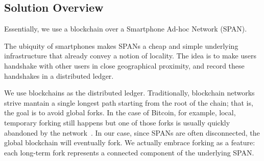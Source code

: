\subsection{Solution Overview}

Essentially,
we use a blockchain over a Smartphone Ad-hoc Network (SPAN).

The ubiquity of smartphones
makes SPANs a cheap and simple underlying infrastructure
that already convey a notion of locality.
The idea is to make users handshake with other users in close geographical proximity,
and record these handshakes in a distributed ledger.

We use blockchains as the distributed ledger.
Traditionally,
blockchain networks strive mantain a single longest path
starting from the root of the chain;
that is,
the goal is to avoid global forks.
In the case of Bitcoin,
for example,
local, temporary forking still happens
but one of those forks is usually quickly abandoned by the network~\cite{decker_2013}.
In our case,
since SPANs are often disconnected,
the global blockchain will eventually fork.
We actually embrace forking as a feature:
each long-term fork represents a connected component of the underlying SPAN.
